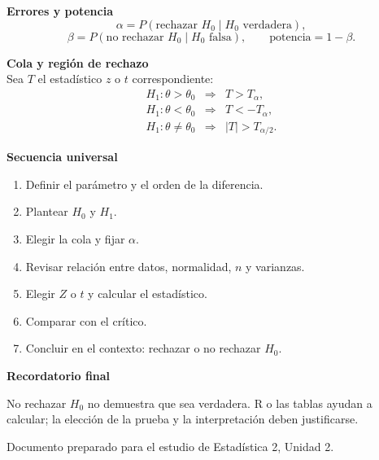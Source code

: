 \documentclass[11pt,a4paper]{article}
\newcommand{\Hcero}{H_0}
\newcommand{\Huno}{H_1}
\newenvironment{regla}[1][Regla para recordar]{%
  \par\medskip\noindent\begingroup\setlength{\fboxsep}{7pt}%
  \begin{lrbox}{\studybox}\begin{minipage}{\dimexpr\linewidth-2\fboxsep\relax}
  \color{verde}\textbf{#1}\par\smallskip\color{black}}{%
  \par\end{minipage}\end{lrbox}\colorbox{verdeclaro}{\usebox{\studybox}}\endgroup\par\medskip}
\begin{document}
\begin{landscape}
\begin{minipage}[t]{.48\linewidth}
\textbf{Errores y potencia}
\[
\alpha=P(\text{rechazar }\Hcero\mid\Hcero\text{ verdadera}),
\]
\[
\beta=P(\text{no rechazar }\Hcero\mid\Hcero\text{ falsa}),
\qquad \text{potencia}=1-\beta.
\]
\end{minipage}
\hfill
\begin{minipage}[t]{.48\linewidth}
\textbf{Cola y región de rechazo}\\[1mm]
Sea $T$ el estadístico $z$ o $t$ correspondiente:
\[
\begin{array}{lll}
\Huno:\theta>\theta_0 & \Rightarrow & T>T_\alpha,\\
\Huno:\theta<\theta_0 & \Rightarrow & T<-T_\alpha,\\
\Huno:\theta\ne\theta_0 & \Rightarrow & |T|>T_{\alpha/2}.
\end{array}
\]

\textbf{Secuencia universal}
\begin{enumerate}[leftmargin=1.7em,itemsep=1pt,topsep=2pt]
\item Definir el parámetro y el orden de la diferencia.
\item Plantear $\Hcero$ y $\Huno$.
\item Elegir la cola y fijar $\alpha$.
\item Revisar relación entre datos, normalidad, $n$ y varianzas.
\item Elegir $Z$ o $t$ y calcular el estadístico.
\item Comparar con el crítico.
\item Concluir en el contexto: rechazar o no rechazar $\Hcero$.
\end{enumerate}
\end{minipage}
\endgroup

\begin{regla}[Recordatorio final]
No rechazar $\Hcero$ no demuestra que sea verdadera. R o las tablas ayudan a calcular; la elección de la prueba y la interpretación deben justificarse.
\end{regla}
\hfill\textcolor{gris}{Documento preparado para el estudio de Estadística 2, Unidad 2.}
\end{landscape}
\pdfpageattr{}
\end{document}
